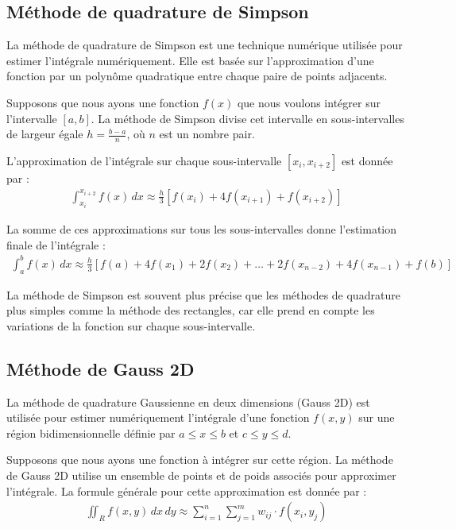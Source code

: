 \documentclass[10pt,a4paper]{article}
\begin{document}
\subsection{Méthode de quadrature de Simpson}

La méthode de quadrature de Simpson est une technique numérique utilisée pour estimer l'intégrale numériquement. Elle est basée sur l'approximation d'une fonction par un polynôme quadratique entre chaque paire de points adjacents.

Supposons que nous ayons une fonction $f(x)$ que nous voulons intégrer sur l'intervalle $[a, b]$. La méthode de Simpson divise cet intervalle en sous-intervalles de largeur égale $h = \frac{b - a}{n}$, où $n$ est un nombre pair.

L'approximation de l'intégrale sur chaque sous-intervalle $[x_i, x_{i+2}]$ est donnée par :
\begin{align*}
\int_{x_i}^{x_{i+2}} f(x) \,dx \approx \frac{h}{3} \left[ f(x_i) + 4f(x_{i+1}) + f(x_{i+2}) \right]
\end{align*}

La somme de ces approximations sur tous les sous-intervalles donne l'estimation finale de l'intégrale :
\begin{align*}
\int_{a}^{b} f(x) \,dx \approx \frac{h}{3} \left[ f(a) + 4f(x_1) + 2f(x_2) + \ldots + 2f(x_{n-2}) + 4f(x_{n-1}) + f(b) \right]
\end{align*}

La méthode de Simpson est souvent plus précise que les méthodes de quadrature plus simples comme la méthode des rectangles, car elle prend en compte les variations de la fonction sur chaque sous-intervalle.


\subsection{Méthode de Gauss 2D}


La méthode de quadrature Gaussienne en deux dimensions (Gauss 2D) est utilisée pour estimer numériquement l'intégrale d'une fonction $f(x, y)$ sur une région bidimensionnelle définie par $a \leq x \leq b$ et $c \leq y \leq d$.

Supposons que nous ayons une fonction à intégrer sur cette région. La méthode de Gauss 2D utilise un ensemble de points et de poids associés pour approximer l'intégrale. La formule générale pour cette approximation est donnée par :
\begin{align*}
\iint_{R} f(x, y) \,dx\,dy \approx \sum_{i=1}^{n} \sum_{j=1}^{m} w_{ij} \cdot f(x_i, y_j)
\end{align*}
\end{document}
